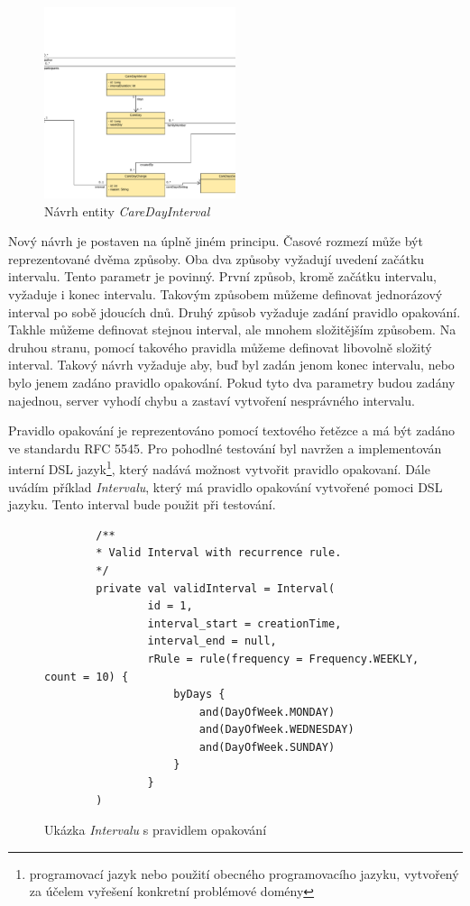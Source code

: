     \begin{figure}\centering
	    \includegraphics[width=0.5\textwidth]{pdfs/CareDayInterval}
	    \caption[Návrh intervalu]{Návrh entity \textit{CareDayInterval}}\label{image:careDayInterval}
    \end{figure}
    
    Nový návrh je postaven na úplně jiném principu. Časové rozmezí může být reprezentované dvěma způsoby. Oba dva způsoby vyžadují uvedení začátku intervalu. Tento parametr je povinný. První způsob, kromě začátku intervalu, vyžaduje i konec intervalu. Takovým způsobem můžeme definovat jednorázový interval po sobě jdoucích dnů. Druhý způsob vyžaduje zadání pravidlo opakování. Takhle můžeme definovat stejnou interval, ale mnohem složitějším způsobem. Na druhou stranu, pomocí takového pravidla můžeme definovat libovolně složitý interval. Takový návrh vyžaduje aby, buď byl zadán jenom konec intervalu, nebo bylo jenem zadáno pravidlo opakování. Pokud tyto dva parametry budou zadány najednou, server vyhodí chybu a zastaví vytvoření nesprávného intervalu.
    
    Pravidlo opakování je reprezentováno pomocí textového řetězce a má být zadáno ve standardu {RFC 5545}\cite{recurrence-rule}. Pro pohodlné testování byl navržen a implementován {interní DSL jazyk}\footnote{programovací jazyk nebo použití obecného programovacího jazyku, vytvořený za účelem vyřešení konkretní problémové domény}, který nadává možnost vytvořit pravidlo opakovaní. Dále uvádím příklad \textit{Intervalu}, který má pravidlo opakování vytvořené pomoci DSL jazyku. Tento interval bude použit při testování.
    \begin{figure}
        \begin{verbatim}
        /**
        * Valid Interval with recurrence rule.
        */
        private val validInterval = Interval(
                id = 1,
                interval_start = creationTime,
                interval_end = null,
                rRule = rule(frequency = Frequency.WEEKLY, count = 10) {
                    byDays {
                        and(DayOfWeek.MONDAY)
                        and(DayOfWeek.WEDNESDAY)
                        and(DayOfWeek.SUNDAY)
                    }
                }
        )
        \end{verbatim}
        \caption{Ukázka \textit{Intervalu} s pravidlem opakování} 
        \label{code:valid-interval}
        \end{figure}
